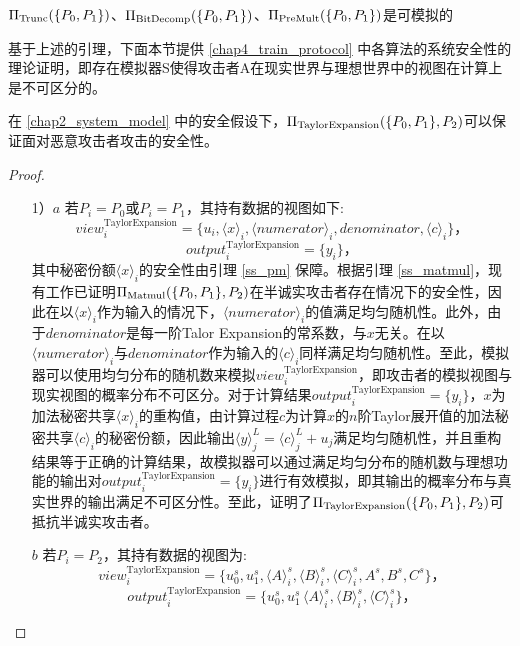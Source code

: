 \begin{lemma} \label{ss_trunc_Bit_premult}
	$\Pi_{\rm Trunc}(\{P_0, P_1\})$、$\Pi_{\rm BitDecomp}(\{P_0, P_1\})$、$\Pi_{\rm PreMult}(\{P_0, P_1\})$是可模拟的\cite{fix_point_mpc}
\end{lemma}

基于上述的引理，下面本节提供 \ref{chap4_train_protocol} 中各算法的系统安全性的理论证明，即存在模拟器S使得攻击者A在现实世界与理想世界中的视图在计算上是不可区分的。

\begin{theorem}
	\label{TayRxp_theorem}
	在 \ref{chap2_system_model} 中的安全假设下，$\Pi_{\rm TaylorExpansion}(\{P_0, P_1\}, P_2)$可以保证面对恶意攻击者攻击的安全性。
\end{theorem}

\begin{proof}
	\begin{itemize}
		\item [1）$a$]
		若$P_i=P_0$或$P_i=P_1$，其持有数据的视图如下:
		$$view_i^{\text{TaylorExpansion}}=\{u_i, \langle x\rangle_i,\langle numerator\rangle_i, denominator, \langle c\rangle_i\}\text{，}$$
		$$output_i^{\text{TaylorExpansion}}=\{y_i\}\text{，}$$
		其中秘密份额$\langle x\rangle_i$的安全性由引理 \ref{ss_pm} 保障。根据引理 \ref{ss_matmul}，现有工作已证明$\Pi_{\rm Matmul}(\{P_0, P_1\}, P_2)$在半诚实攻击者存在情况下的安全性，因此在以$\langle x\rangle_i$作为输入的情况下，$\langle numerator\rangle_i$的值满足均匀随机性。此外，由于$denominator$是每一阶Talor Expansion的常系数，与$x$无关。在以$\langle numerator\rangle_i$与$denominator$作为输入的$\langle c\rangle_i$同样满足均匀随机性。至此，模拟器可以使用均匀分布的随机数来模拟$view_i^{\text{TaylorExpansion}}$，即攻击者的模拟视图与现实视图的概率分布不可区分。对于计算结果$output_i^{\text{TaylorExpansion}}=\{y_i\}$，$x$为加法秘密共享$\langle x\rangle_i$的重构值，由计算过程$c$为计算$x$的$n$阶Taylor展开值的加法秘密共享$\langle c\rangle_i$的秘密份额，因此输出$\langle y\rangle_j^L = \langle c\rangle_j^L + u_j$满足均匀随机性，并且重构结果等于正确的计算结果，故模拟器可以通过满足均匀分布的随机数与理想功能的输出对$output_i^{\text{TaylorExpansion}}=\{y_i\}$进行有效模拟，即其输出的概率分布与真实世界的输出满足不可区分性。至此，证明了$\Pi_{\rm TaylorExpansion}(\{P_0, P_1\}, P_2)$可抵抗半诚实攻击者。
		
		\item [$b$]
		若$P_i=P_2$，其持有数据的视图为:
		$$view_i^{\text{TaylorExpansion}}=\{u_0^s, u_1^s, \langle A\rangle_i^s,\langle B\rangle_i^s,\langle C\rangle_i^s, A^s, B^s, C^s\}\text{，}$$
		$$output_i^{\text{TaylorExpansion}}=\{u_0^s, u_1^s\, \langle A\rangle_i^s,\langle B\rangle_i^s,\langle C\rangle_i^s\}\text{，}$$
	

\end{itemize}
\end{proof}
